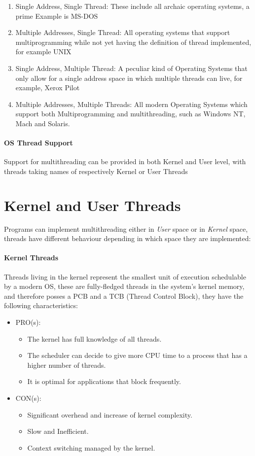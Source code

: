 \documentclass[openright, twoside]{report}
\theoremstyle{definition}
\theoremstyle{example}
\begin{document}
		\begin{enumerate}
			\item Single Address, Single Thread: 
			These include all archaic operating systems, a prime Example is MS-DOS
			\item Multiple Addresses, Single Thread: 
			All operating systems that support multiprogramming while not yet having the 
			definition of thread implemented, for example UNIX
			\item Single Address, Multiple Thread:
			A peculiar kind of Operating Systems that only allow for a single address space 
			in which multiple threads can live, for example, Xerox Pilot
			\item Multiple Addresses, Multiple Threads:
			All modern Operating Systems which support both Multiprogramming and multithreading,
			such as Windows NT, Mach and Solaris.
		\end{enumerate}

		\paragraph{OS Thread Support}
		Support for multithreading can be provided in both Kernel and User level, with threads 
		taking names of respectively Kernel or User Threads

	\section{Kernel and User Threads}
	Programs can implement multithreading either in \emph{User} space or in \emph{Kernel}
	space, threads have different behaviour depending in which space they are implemented:

	\paragraph{Kernel Threads}
	Threads living in the kernel represent the smallest unit of execution schedulable 
		by a modern OS, these are fully-fledged threads in the system's kernel memory, and 
		therefore posses a PCB and a TCB (Thread Control Block), they have the following characteristics:
		\begin{itemize}
			\item PRO(s):
			\begin{itemize}
				\item The kernel has full knowledge of all threads.
				\item The scheduler can decide to give more CPU time to a process that 
				has a higher number of threads.
				\item It is optimal for applications that block frequently.
			\end{itemize}
			\item CON(s):
			\begin{itemize}
				\item Significant overhead and increase of kernel complexity.
				\item Slow and Inefficient.
				\item Context switching managed by the kernel.
			\end{itemize}
		\end{itemize}
\end{document}
